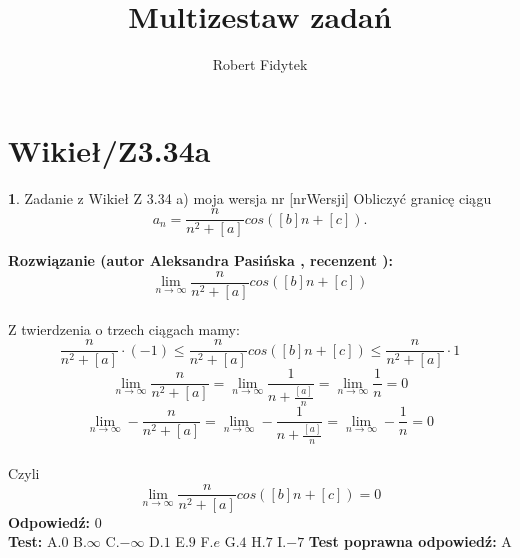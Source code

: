 \documentclass[12pt, a4paper]{article}
\title{Multizestaw zadań}
\author{Robert Fidytek}
\date{}
\theoremstyle{definition} %
\newtheorem{zad}{}
\newcommand{\kategoria}[1]{\section{#1}} %
\newcommand{\zadStart}[1]{\begin{zad}#1\newline} %
\newcommand{\zadStop}{\end{zad}}   %
\newcommand{\rozwStart}[2]{\noindent \textbf{Rozwiązanie (autor #1 , recenzent #2): }\newline} %
\newcommand{\rozwStop}{\newline}                                            %
\newcommand{\odpStart}{\noindent \textbf{Odpowiedź:}\newline}    %
\newcommand{\odpStop}{\newline}                                             %
\newcommand{\testStart}{\noindent \textbf{Test:}\newline} %
\newcommand{\testStop}{\newline} %
\newcommand{\kluczStart}{\noindent \textbf{Test poprawna odpowiedź:}\newline} %
\newcommand{\kluczStop}{\newline} %
\begin{document}
\maketitle


\kategoria{Wikieł/Z3.34a}
\zadStart{Zadanie z Wikieł Z 3.34 a) moja wersja nr [nrWersji]}
Obliczyć granicę ciągu $$a_n=\frac{n}{n^2+[a]}cos([b]n+[c]).$$
\zadStop
\rozwStart{Aleksandra Pasińska}{}
$$\lim_{n\rightarrow \infty}\frac{n}{n^2+[a]}cos([b]n+[c])$$\\
Z twierdzenia o trzech ciągach mamy:
$$\frac{n}{n^2+[a]}\cdot (-1) \leqslant \frac{n}{n^2+[a]}cos([b]n+[c]) \leqslant \frac{n}{n^2+[a]}\cdot 1$$
$$\lim_{n\rightarrow \infty}\frac{n}{n^2+[a]}=\lim_{n\rightarrow \infty}\frac{1}{n+\frac{[a]}{n}}=\lim_{n\rightarrow \infty}\frac{1}{n}=0$$
$$\lim_{n\rightarrow \infty}-\frac{n}{n^2+[a]}=\lim_{n\rightarrow \infty}-\frac{1}{n+\frac{[a]}{n}}=\lim_{n\rightarrow \infty}-\frac{1}{n}=0$$\\
Czyli $$\lim_{n\rightarrow \infty}\frac{n}{n^2+[a]}cos([b]n+[c])=0$$
\rozwStop
\odpStart
$0$\\
\odpStop
\testStart
A.$0$
B.$\infty$
C.$-\infty$
D.$1$
E.$9$
F.$e$
G.$4$
H.$7$
I.$-7$
\testStop
\kluczStart
A
\kluczStop
\end{document}
